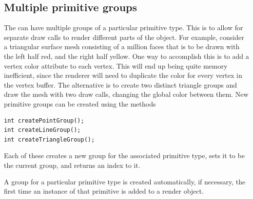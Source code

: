 \subsection{Multiple primitive groups}
\label{primitiveGroups:sec}

The  can have multiple
groups of a particular primitive type.  This is to allow for separate
draw calls to render different parts of the object.  For example,
consider a triangular surface mesh consisting of a million faces that
is to be drawn with the left half red, and the right half yellow.  One
way to accomplish this is to add a vertex color attribute to each
vertex.  This will end up being quite memory inefficient, since the
renderer will need to duplicate the color for every vertex in the
vertex buffer.  The alternative is to create two distinct triangle
groups and draw the mesh with two draw calls, changing the global
color between them. New primitive groups can be created using
the methods
%
\begin{lstlisting}[]
int createPointGroup();
int createLineGroup();
int createTriangleGroup();
\end{lstlisting}
%
Each of these creates a new group for the associated primitive type,
sets it to be the current group, and returns an index to it.

\begin{sideblock}
A group for a particular primitive type is created automatically, if
necessary, the first time an instance of that primitive is added to a
render object.
\end{sideblock}

